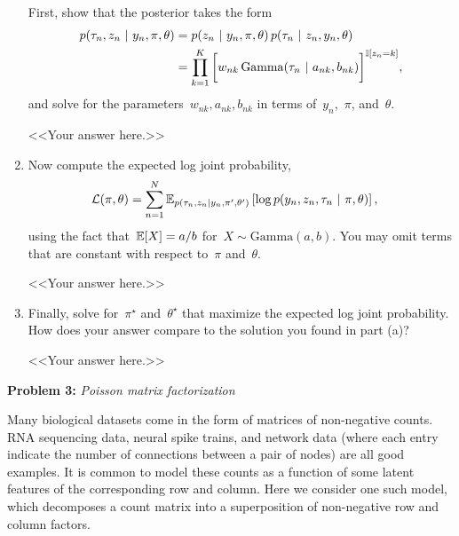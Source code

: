 \documentclass[11pt]{article}
\begin{document}
\begin{enumerate}[label=(\alph*)]
First, show that the posterior takes the form
\begin{align*}
    p(\tau_n, z_n ~\vert~ y_n, \pi, \theta) &= p(z_n ~\vert~ y_n, \pi, \theta) \, p(\tau_n ~\vert~ z_n, y_n, \theta)\\
    &= \prod_{k=1}^K \bigg[ w_{nk} \, \mathrm{Gamma}(\tau_n ~\vert~ a_{nk}, b_{nk}) \bigg]^{\mathbb{I}[z_n = k]},
\end{align*}
and solve for the parameters~$w_{nk}, a_{nk}, b_{nk}$ in terms of~$y_n$,~$\pi$, and~$\theta$.

\begin{solution}
<<Your answer here.>>
\end{solution}

\item Now compute the expected log joint probability,
\begin{align*}
    \mathcal{L}(\pi, \theta) &= \sum_{n=1}^N \mathbb{E}_{p(\tau_n, z_n | y_n, \pi', \theta')} \left[ \log p(y_n, z_n, \tau_n ~\vert~ \pi, \theta) \right],
\end{align*}
using the fact that~$\mathbb{E}[X] = a/b$ for~$X \sim \mathrm{Gamma}(a, b)$.  You may omit terms that are constant with respect to~$\pi$ and~$\theta$.

\begin{solution}
<<Your answer here.>>
\end{solution}

\item Finally, solve for~$\pi^\star$ and~$\theta^\star$ that maximize the expected log joint probability.  How does your answer compare to the solution you found in part (a)?

\begin{solution}
<<Your answer here.>>
\end{solution}

\end{enumerate}

\clearpage

\textbf{Problem 3:} \textit{Poisson matrix factorization}

Many biological datasets come in the form of matrices of non-negative counts.  RNA sequencing data, neural spike trains, and network data (where each entry indicate the number of connections between a pair of nodes) are all good examples.  It is common to model these counts as a function of some latent features of the corresponding row and column.  Here we consider one such model, which decomposes a count matrix into a superposition of non-negative row and column factors. 
\end{document}

